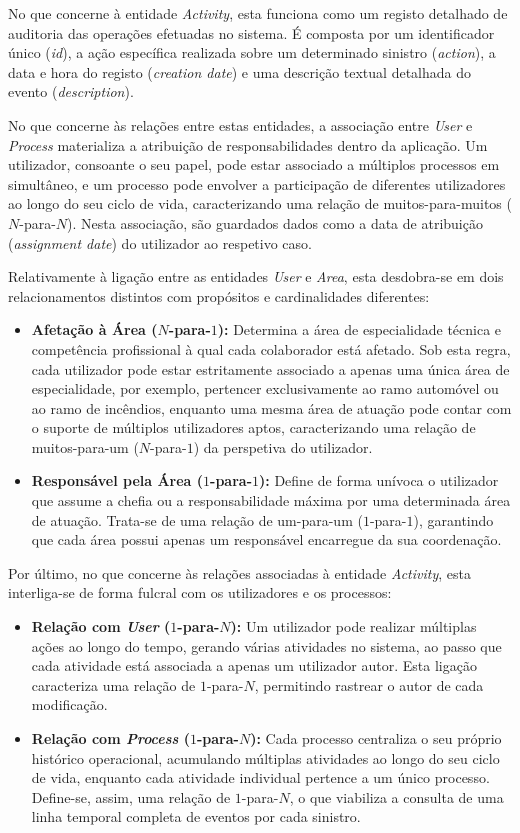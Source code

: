 No que concerne à entidade \textit{Activity}, esta funciona como um registo detalhado de auditoria das operações efetuadas no sistema. É composta por um identificador único (\textit{id}), a ação específica realizada sobre um determinado sinistro (\textit{action}), a data e hora do registo (\textit{creation date}) e uma descrição textual detalhada do evento (\textit{description}).

No que concerne às relações entre estas entidades, a associação entre \textit{User} e \textit{Process} materializa a atribuição de responsabilidades dentro da aplicação. Um utilizador, consoante o seu papel, pode estar associado a múltiplos processos em simultâneo, e um processo pode envolver a participação de diferentes utilizadores ao longo do seu ciclo de vida, caracterizando uma relação de muitos-para-muitos ($N$-para-$N$). Nesta associação, são guardados dados como a data de atribuição (\textit{assignment date}) do utilizador ao respetivo caso.

Relativamente à ligação entre as entidades \textit{User} e \textit{Area}, esta desdobra-se em dois relacionamentos distintos com propósitos e cardinalidades diferentes:
\begin{itemize}
  \item \textbf{Afetação à Área ($N$-para-$1$):} Determina a área de especialidade técnica e competência profissional à qual cada colaborador está afetado. Sob esta regra, cada utilizador pode estar estritamente associado a apenas uma única área de especialidade, por exemplo, pertencer exclusivamente ao ramo automóvel ou ao ramo de incêndios, enquanto uma mesma área de atuação pode contar com o suporte de múltiplos utilizadores aptos, caracterizando uma relação de muitos-para-um ($N$-para-$1$) da perspetiva do utilizador.
  \item \textbf{Responsável pela Área ($1$-para-$1$):} Define de forma unívoca o utilizador que assume a chefia ou a responsabilidade máxima por uma determinada área de atuação. Trata-se de uma relação de um-para-um ($1$-para-$1$), garantindo que cada área possui apenas um responsável encarregue da sua coordenação.
\end{itemize}

Por último, no que concerne às relações associadas à entidade \textit{Activity}, esta interliga-se de forma fulcral com os utilizadores e os processos:
\begin{itemize}
  \item \textbf{Relação com \textit{User} ($1$-para-$N$):} Um utilizador pode realizar múltiplas ações ao longo do tempo, gerando várias atividades no sistema, ao passo que cada atividade está associada a apenas um utilizador autor. Esta ligação caracteriza uma relação de $1$-para-$N$, permitindo rastrear o autor de cada modificação.
  \item \textbf{Relação com \textit{Process} ($1$-para-$N$):} Cada processo centraliza o seu próprio histórico operacional, acumulando múltiplas atividades ao longo do seu ciclo de vida, enquanto cada atividade individual pertence a um único processo. Define-se, assim, uma relação de $1$-para-$N$, o que viabiliza a consulta de uma linha temporal completa de eventos por cada sinistro.
\end{itemize}


